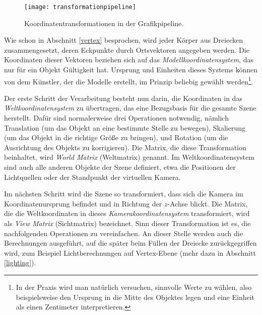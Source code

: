 \begin{wrapfigure}{R}{0.3\textwidth}
  \texttt{[image: transformationpipeline]}
  \vspace{-10pt}
  \caption{Koordinatentransformationen in der Grafikpipeline.}
\end{wrapfigure}

Wie schon in Abschnitt \ref{vertex} besprochen, wird jeder Körper aus Dreiecken zusammengesetzt, deren Eckpunkte durch Ortsvektoren angegeben werden. Die Koordinaten dieser Vektoren beziehen sich auf das \emph{Modellkoordinatensystem}, das nur für ein Objekt Gültigkeit hat. Ursprung und Einheiten dieses Systems können von dem Künstler, der die Modelle erstellt, im Prinzip beliebig gewählt werden\footnote{In der Praxis wird man natürlich versuchen, sinnvolle Werte zu wählen, also beispielsweise den Ursprung in die Mitte des Objektes legen und eine Einheit als einen Zentimeter interpretieren.}.

Der erste Schritt der Verarbeitung besteht nun darin, die Koordinaten in das \emph{Weltkoordinatensystem} zu übertragen, das eine Bezugsbasis für die gesamte Szene herstellt. Dafür sind normalerweise drei Operationen notwendig, nämlich Translation (um das Objekt an eine bestimmte Stelle zu bewegen), Skalierung (um das Objekt in die richtige Größe zu bringen), und Rotation (um die Ausrichtung des Objekts zu korrigieren). Die Matrix, die diese Transformation beinhaltet, wird \emph{World Matrix} (Weltmatrix) genannt. Im Weltkoordinatensystem sind auch alle anderen Objekte der Szene definiert, etwa die Positionen der Lichtquellen oder der Standpunkt der virtuellen Kamera.

Im nächsten Schritt wird die Szene so transformiert, dass sich die Kamera im Koordinatenursprung befindet und in Richtung der $z$-Achse blickt. Die Matrix, die die Weltkoordinaten in dieses \emph{Kamerakoordinatensystem} transformiert, wird als \emph{View Matrix} (Sichtmatrix) bezeichnet. Sinn dieser Transformation ist es, die nachfolgenden Operationen zu vereinfachen. An dieser Stelle werden auch die Berechnungen ausgeführt, auf die später beim Füllen der Dreiecke zurückgegriffen wird, zum Beispiel Lichtberechnungen auf Vertex-Ebene (mehr dazu in Abschnitt \ref{lighting}).

